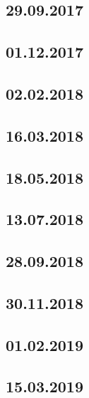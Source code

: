 \documentclass[a4paper,12p]{article}
\begin{document}
	\newpage
	\subsection{29.09.2017}
	
	
	
	
	
	\newpage
	\subsection{01.12.2017}
	
	
	
	
	
	\subsection{02.02.2018}
	
	
	
	
	
	\newpage
	\subsection{16.03.2018}
	
	
	
	
	
	
	\subsection{18.05.2018}
	\subsection{13.07.2018}
	\subsection{28.09.2018}
	\subsection{30.11.2018}
	\subsection{01.02.2019}
	
	\newpage
	\subsection{15.03.2019} %
		
	
	
\end{document}
